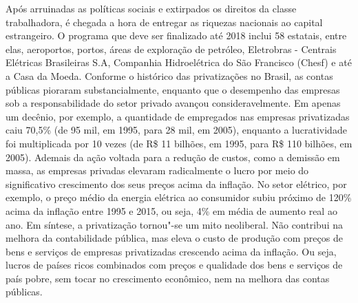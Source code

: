 Após arruinadas as políticas sociais e extirpados os direitos da classe
trabalhadora, é chegada a hora de entregar as riquezas nacionais ao
capital estrangeiro. O programa que deve ser finalizado até 2018 inclui
58 estatais, entre elas, aeroportos, portos, áreas de exploração de
petróleo, Eletrobras - Centrais Elétricas Brasileiras S.A, Companhia
Hidroelétrica do São Francisco (Chesf) e até a Casa da Moeda. Conforme o
histórico das privatizações no Brasil, as contas públicas pioraram
substancialmente, enquanto que o desempenho das empresas sob a
responsabilidade do setor privado avançou consideravelmente. Em apenas
um decênio, por exemplo, a quantidade de empregados nas empresas
privatizadas caiu 70,5\% (de 95 mil, em 1995, para 28 mil, em 2005),
enquanto a lucratividade foi multiplicada por 10 vezes (de R\$ 11
bilhões, em 1995, para R\$ 110 bilhões, em 2005). Ademais da ação
voltada para a redução de custos, como a demissão em massa, as empresas
privadas elevaram radicalmente o lucro por meio do significativo
crescimento dos seus preços acima da inflação. No setor elétrico, por
exemplo, o preço médio da energia elétrica ao consumidor subiu próximo
de 120\% acima da inflação entre 1995 e 2015, ou seja, 4\% em média de
aumento real ao ano. Em síntese, a privatização tornou"-se um mito
neoliberal. Não contribui na melhora da contabilidade pública, mas eleva
o custo de produção com preços de bens e serviços de empresas
privatizadas crescendo acima da inflação. Ou seja, lucros de países
ricos combinados com preços e qualidade dos bens e serviços de país
pobre, sem tocar no crescimento econômico, nem na melhora das contas
públicas.

